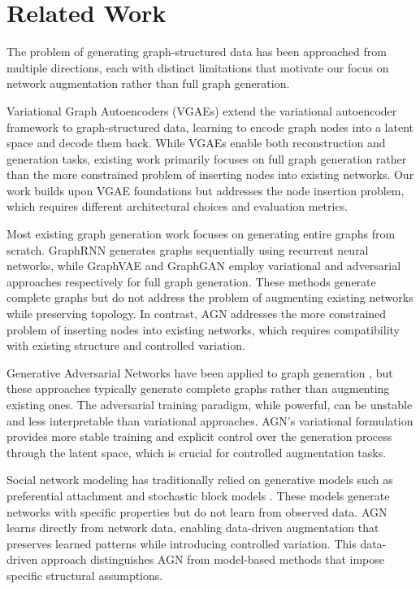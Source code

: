 \documentclass[12pt]{article}
\begin{document}
\section{Related Work}

The problem of generating graph-structured data has been approached from multiple directions, each with distinct limitations that motivate our focus on network augmentation rather than full graph generation.

Variational Graph Autoencoders (VGAEs) \cite{kipf2016variational} extend the variational autoencoder framework \cite{kingma2013auto} to graph-structured data, learning to encode graph nodes into a latent space and decode them back. While VGAEs enable both reconstruction and generation tasks, existing work primarily focuses on full graph generation rather than the more constrained problem of inserting nodes into existing networks. Our work builds upon VGAE foundations but addresses the node insertion problem, which requires different architectural choices and evaluation metrics.

Most existing graph generation work focuses on generating entire graphs from scratch. GraphRNN \cite{you2018graphrnn} generates graphs sequentially using recurrent neural networks, while GraphVAE \cite{simonovsky2018graphvae} and GraphGAN \cite{wang2018graphgan} employ variational and adversarial approaches respectively for full graph generation. These methods generate complete graphs but do not address the problem of augmenting existing networks while preserving topology. In contrast, AGN addresses the more constrained problem of inserting nodes into existing networks, which requires compatibility with existing structure and controlled variation.

Generative Adversarial Networks have been applied to graph generation \cite{wang2018graphgan, bojchevski2018netgan}, but these approaches typically generate complete graphs rather than augmenting existing ones. The adversarial training paradigm, while powerful, can be unstable and less interpretable than variational approaches. AGN's variational formulation provides more stable training and explicit control over the generation process through the latent space, which is crucial for controlled augmentation tasks.

Social network modeling has traditionally relied on generative models such as preferential attachment \cite{barabasi1999emergence} and stochastic block models \cite{holland1983stochastic}. These models generate networks with specific properties but do not learn from observed data. AGN learns directly from network data, enabling data-driven augmentation that preserves learned patterns while introducing controlled variation. This data-driven approach distinguishes AGN from model-based methods that impose specific structural assumptions.
\end{document}

